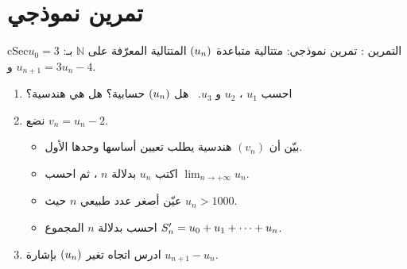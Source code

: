 \documentclass[12pt,a4paper]{article}
\newenvironment{BOX}[2]{\begin{otherlanguage}{english}\begin{arbox}{#1}{#2}}{\end{arbox}\end{otherlanguage}}
\newcounter{exo}
\newenvironment{tamrin}[1]{\stepcounter{exo}\begin{BOX}{cSec}{التمرين \theexo: #1}}{\end{BOX}}
\renewcommand{\cdots}{\mathinner{\cdotp\cdotp\cdotp}}
\newcommand{\N}{\mathbb{N}}
\newcommand{\limn}{\displaystyle\lim_{n\to+\infty}}
\newenvironment{sq}{\begin{itemize}[leftmargin=2.4em,itemsep=3pt]}{\end{itemize}}
\newcommand{\qa}{\item[(أ)]}\newcommand{\qb}{\item[(ب)]}\newcommand{\qc}{\item[(جـ)]}\newcommand{\qd}{\item[(د)]}\newcommand{\qe}{\item[(هـ)]}
\begin{document}
\section{تمرين نموذجي}
\begin{tamrin}{تمرين نموذجي: متتالية متباعدة}
$\Un$ المتتالية المعرّفة على $\N$ بـ: $u_0=3$ و $u_{n+1}=3u_n-4$.
\begin{enumerate}
\item احسب $u_1$ ، $u_2$ و $u_3$. \ هل $\Un$ حسابية؟ هل هي هندسية؟
\item نضع $v_n=u_n-2$.
\begin{sq}
\qa بيّن أن $(v_n)$ هندسية يطلب تعيين أساسها وحدها الأول.
\qb اكتب $u_n$ بدلالة $n$ ، ثم احسب $\limn u_n$.
\qc عيّن أصغر عدد طبيعي $n$ حيث $u_n>1000$.
\qd احسب بدلالة $n$ المجموع $S'_n=u_0+u_1+\cdots+u_n$.
\end{sq}
\item ادرس اتجاه تغير $\Un$ بإشارة $u_{n+1}-u_n$.
\end{enumerate}
\end{tamrin}
\end{document}
